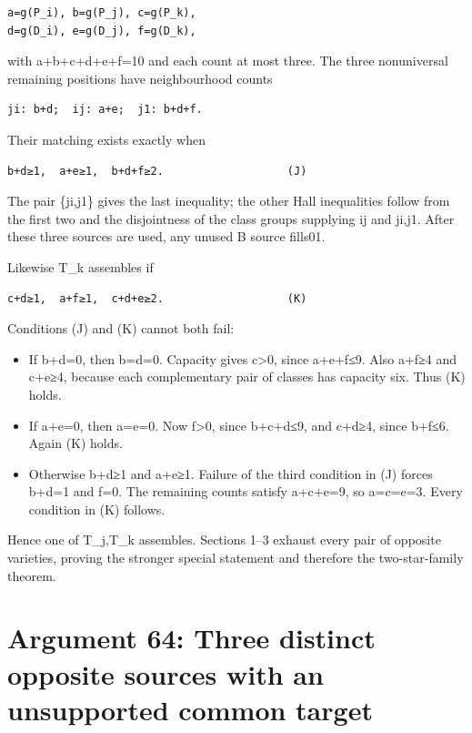 \documentclass[
  10pt,
]{article}
\providecommand{\tightlist}{%
  \setlength{\itemsep}{0pt}\setlength{\parskip}{0pt}}
\begin{document}
\begin{verbatim}
a=g(P_i), b=g(P_j), c=g(P_k),
d=g(D_i), e=g(D_j), f=g(D_k),
\end{verbatim}

with a+b+c+d+e+f=10 and each count at most three. The three nonuniversal
remaining positions have neighbourhood counts

\begin{verbatim}
ji: b+d;  ij: a+e;  j1: b+d+f.
\end{verbatim}

Their matching exists exactly when

\begin{verbatim}
b+d≥1,  a+e≥1,  b+d+f≥2.                   (J)
\end{verbatim}

The pair \{ji,j1\} gives the last inequality; the other Hall
inequalities follow from the first two and the disjointness of the class
groups supplying ij and ji,j1. After these three sources are used, any
unused B source fills01.

Likewise T\_k assembles if

\begin{verbatim}
c+d≥1,  a+f≥1,  c+d+e≥2.                   (K)
\end{verbatim}

Conditions (J) and (K) cannot both fail:

\begin{itemize}
\tightlist
\item
  If b+d=0, then b=d=0. Capacity gives c\textgreater0, since a+e+f≤9.
  Also a+f≥4 and c+e≥4, because each complementary pair of classes has
  capacity six. Thus (K) holds.
\item
  If a+e=0, then a=e=0. Now f\textgreater0, since b+c+d≤9, and c+d≥4,
  since b+f≤6. Again (K) holds.
\item
  Otherwise b+d≥1 and a+e≥1. Failure of the third condition in (J)
  forces b+d=1 and f=0. The remaining counts satisfy a+c+e=9, so
  a=c=e=3. Every condition in (K) follows.
\end{itemize}

Hence one of T\_j,T\_k assembles. Sections 1--3 exhaust every pair of
opposite varieties, proving the stronger special statement and therefore
the two-star-family theorem.

\hypertarget{arg-64}{%
\section{Argument 64: Three distinct opposite sources with an
unsupported common target}\label{arg-64}}
\end{document}

